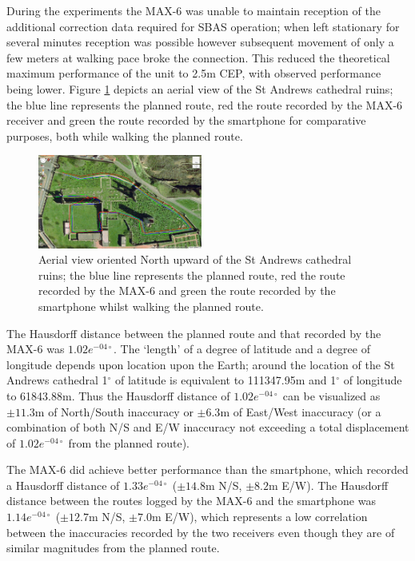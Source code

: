 During the experiments the MAX-6 was unable to maintain reception of the additional correction data required for SBAS operation; when left stationary for several minutes reception was possible however subsequent movement of only a few meters at walking pace broke the connection. This reduced the theoretical maximum performance of the unit to 2.5m CEP, with observed performance being lower. Figure \ref{map_one} depicts an aerial view of the St Andrews cathedral ruins; the blue line represents the planned route, red the route recorded by the MAX-6 receiver and green the route recorded by the smartphone for comparative purposes, both while walking the planned route.

\begin{figure}[h]
\centering
\includegraphics[width=0.48\textwidth]{images/figure_4}
\caption{Aerial view oriented North upward of the St Andrews cathedral ruins; the blue line represents the planned route, red the route recorded by the MAX-6 and green the route recorded by the smartphone whilst walking the planned route.}
\label{map_one}
\end{figure}

The Hausdorff distance between the planned route and that recorded by the MAX-6 was $1.02e^{-04\circ}$. The `length' of a degree of latitude and a degree of longitude depends upon location upon the Earth; around the location of the St Andrews cathedral 1$^\circ$ of latitude is equivalent to 111347.95m and 1$^\circ$ of longitude to 61843.88m. Thus the Hausdorff distance of $1.02e^{-04\circ}$ can be visualized as $\pm11.3$m of North/South inaccuracy or $\pm6.3$m of East/West inaccuracy (or a combination of both N/S and E/W inaccuracy not exceeding a total displacement of $1.02e^{-04\circ}$ from the planned route).

The MAX-6 did achieve better performance than the smartphone, which recorded a Hausdorff distance of $1.33e^{-04\circ}$ ($\pm14.8$m N/S, $\pm8.2$m E/W). The Hausdorff distance between the routes logged by the MAX-6 and the smartphone was $1.14e^{-04\circ}$ ($\pm12.7$m N/S, $\pm7.0$m E/W), which represents a low correlation between the inaccuracies recorded by the two receivers even though they are of similar magnitudes from the planned route.

